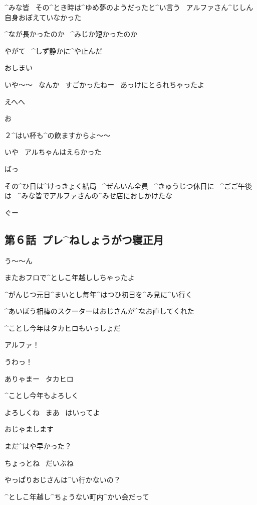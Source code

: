 \page[111]
\Narrator ^{みな}{皆}
\ その^{とき}{時}は^{ゆめ}{夢}のようだったと^{い}{言}う
\ アルファさん^{じしん}{自身}おぼえていなかった

\Narrator ^{なが}{長}かったのか
\ ^{みじか}{短}かったのか

\page[112]
\Narrator やがて
\ ^{しず}{静}かに^{や}{止}んだ

\Alpha おしまい

\Person いや〜〜
\ なんか
\ すごかったねー
\ あっけにとられちゃったよ

\Alpha えへへ

\page[113]
\Person お

\Ojisan ２^{はい}{杯}も^{の}{飲}ますからよ〜〜

\Person いや
\ アルちゃんはえらかった

\page[114]
\Alpha ばっ

\Narrator その^{ひ}{日}は^{けっきょく}{結局}
\ ^{ぜんいん}{全員}
\ ^{きゅうじつ}{休日}に
\ ^{ごご}{午後}は
\ ^{みな}{皆}でアルファさんの^{みせ}{店}におしかけたな

\Alpha ぐー


\subsection{第６話\ プレ^{ねしょうがつ}{寝正月}}

\page[116]
\Alpha う〜〜ん

\Alpha またおフロで^{としこ}{年越}ししちゃったよ

\Alpha ^{がんじつ}{元日}^{まいとし}{毎年}^{はつひ}{初日}を^{み}{見}に^{い}{行}く

\Alpha ^{あいぼう}{相棒}のスクーターはおじさんが^{なお}{直}してくれた

\page[117]
\Alpha ^{ことし}{今年}はタカヒロもいっしょだ

\Takahiro アルファ！

\Alpha うわっ！

\page[118]
\Alpha ありゃまー
\ タカヒロ

\Takahiro ^{ことし}{今年}もよろしく

\Alpha よろしくね
\ まあ
\ はいってよ

\Takahiro おじゃまします

\Takahiro まだ^{はや}{早}かった？

\Alpha ちょっとね
\ だいぶね

\Alpha やっぱりおじさんは^{い}{行}かないの？

\Takahiro ^{としこ}{年越}し^{ちょうない}{町内}^{かい}{会}だって

